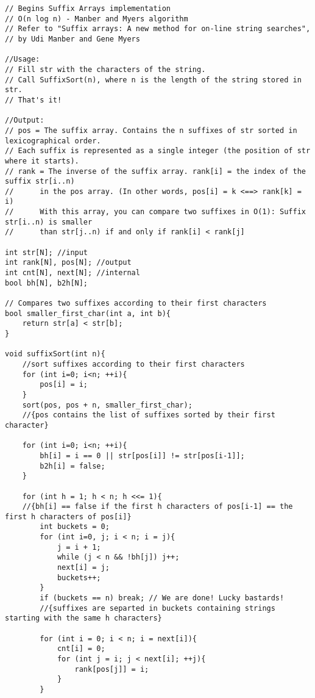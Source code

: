 \documentclass[a4paper,final,8pt]{article}
\begin{document}
\begin{lstlisting}
// Begins Suffix Arrays implementation
// O(n log n) - Manber and Myers algorithm
// Refer to "Suffix arrays: A new method for on-line string searches",
// by Udi Manber and Gene Myers

//Usage:
// Fill str with the characters of the string.
// Call SuffixSort(n), where n is the length of the string stored in str.
// That's it!

//Output:
// pos = The suffix array. Contains the n suffixes of str sorted in lexicographical order.
// Each suffix is represented as a single integer (the position of str where it starts).
// rank = The inverse of the suffix array. rank[i] = the index of the suffix str[i..n)
//      in the pos array. (In other words, pos[i] = k <==> rank[k] = i)
//      With this array, you can compare two suffixes in O(1): Suffix str[i..n) is smaller
//      than str[j..n) if and only if rank[i] < rank[j]

int str[N]; //input
int rank[N], pos[N]; //output
int cnt[N], next[N]; //internal
bool bh[N], b2h[N];

// Compares two suffixes according to their first characters
bool smaller_first_char(int a, int b){
    return str[a] < str[b];
}

void suffixSort(int n){
    //sort suffixes according to their first characters
    for (int i=0; i<n; ++i){
        pos[i] = i;
    }
    sort(pos, pos + n, smaller_first_char);
    //{pos contains the list of suffixes sorted by their first character}

    for (int i=0; i<n; ++i){
        bh[i] = i == 0 || str[pos[i]] != str[pos[i-1]];
        b2h[i] = false;
    }

    for (int h = 1; h < n; h <<= 1){
    //{bh[i] == false if the first h characters of pos[i-1] == the first h characters of pos[i]}
        int buckets = 0;
        for (int i=0, j; i < n; i = j){
            j = i + 1;
            while (j < n && !bh[j]) j++;
            next[i] = j;
            buckets++;
        }
        if (buckets == n) break; // We are done! Lucky bastards!
        //{suffixes are separted in buckets containing strings starting with the same h characters}

        for (int i = 0; i < n; i = next[i]){
            cnt[i] = 0;
            for (int j = i; j < next[i]; ++j){
                rank[pos[j]] = i;
            }
        }


\end{lstlisting}
\end{document}
